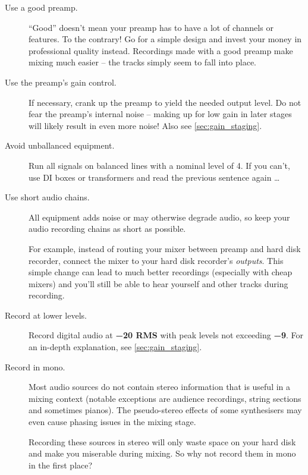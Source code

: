 \begin{description}

\item[Use a good preamp.]  ``Good'' doesn't mean your preamp has to
  have a lot of channels or features.  To the contrary!  Go for a
  simple design and invest your money in professional quality instead.
  Recordings made with a good preamp make mixing much easier -- the
  tracks simply seem to fall into place.

\item[ Use the preamp's gain control.]  If necessary, crank up the
  preamp to yield the needed output level.  Do not fear the preamp's
  internal noise -- making up for low gain in later stages will likely
  result in even more noise!  Also see \ref{sec:gain_staging}.

\item[Avoid unballanced equipment.]  Run all signals on balanced lines
  with a nominal level of \SI[addsign=all]{+4}{\dBu}.  If you can't,
  use DI boxes or transformers and read the previous sentence again
  \dots

\item[Use short audio chains.]  All equipment adds noise or may
  otherwise degrade audio, so keep your audio recording chains as
  short as possible.

  For example, instead of routing your mixer between preamp and hard
  disk recorder, connect the mixer to your hard disk recorder's
  \emph{outputs}.  This simple change can lead to much better
  recordings (especially with cheap mixers) and you'll still be able
  to hear yourself and other tracks during recording.

\item[Record at lower levels.]  Record digital audio at
  \textbf{\SI{-20}{\dBFS} RMS} with peak levels not exceeding
  \textbf{\SI{-9}{\dBFS}}.  For an in-depth explanation, see
  \ref{sec:gain_staging}.

\item[Record in mono.]  Most audio sources do not contain stereo
  information that is useful in a mixing context (notable exceptions
  are audience recordings, string sections and sometimes pianos).  The
  pseudo-stereo effects of some synthesisers may even cause phasing
  issues in the mixing stage.

  Recording these sources in stereo will only waste space on your hard
  disk and make you miserable during mixing.  So why not record them
  in mono in the first place?


\end{description}
